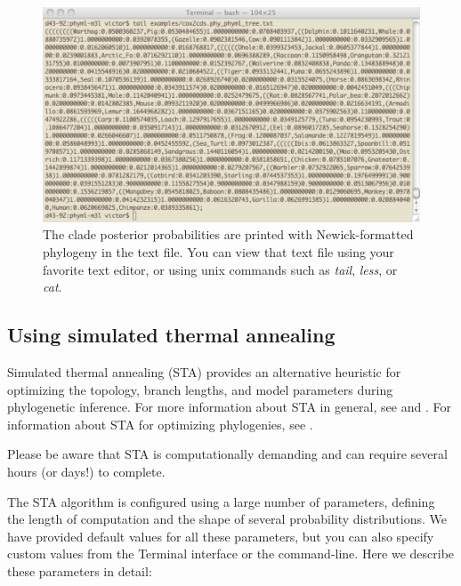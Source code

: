 \documentclass[11pt]{article}
\begin{document}
\begin{figure}[p]
\centering
\includegraphics[width=5.5 in]{GRAPHICS/b8.pdf}
\caption{The clade posterior probabilities are printed with Newick-formatted phylogeny in the text file.  You can view that text file using your favorite text editor, or using unix commands such as \textit{tail}, \textit{less}, or \textit{cat}.}
\end{figure}
\clearpage

\subsection{Using simulated thermal annealing}
Simulated thermal annealing (STA) provides an alternative heuristic for optimizing the topology, branch lengths, and model parameters during phylogenetic inference.  For more information about STA in general, see \cite{Kirkpatrick1983} and \cite{kirkpatrick1984}.  For information about STA for optimizing phylogenies, see \cite{kolaczkowski2008}.

\medskip
\noindent Please be aware that STA is computationally demanding and can require several hours (or days!) to complete.

\medskip
The STA algorithm is configured using a large number of parameters, defining the length of computation and the shape of several probability distributions.  We have provided default values for all these parameters, but you can also specify custom values from the Terminal interface or the command-line.  Here we describe these parameters in detail:
\end{document}
